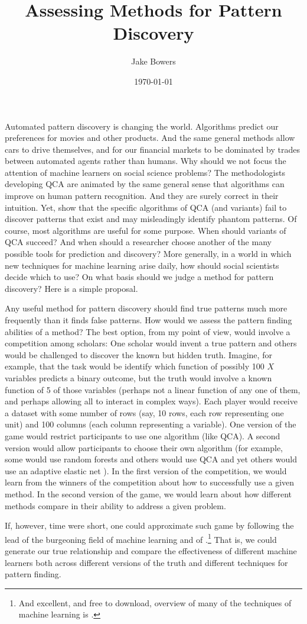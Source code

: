 \documentclass[12pt]{article}
\title{Assessing Methods for Pattern Discovery}
\author{Jake Bowers}
\date{\today}
\begin{document}
\maketitle

Automated pattern discovery is changing the world. Algorithms predict our
preferences for movies and other products. And the same general methods allow
cars to drive themselves, and for our financial markets to be dominated by
trades between automated agents rather than humans. Why should we not focus
the attention of machine learners on social science problems? The
methodologists developing QCA are animated by the same general sense that
algorithms can improve on human pattern recognition. And they are surely
correct in their intuition. Yet, \citet{lucasfk2013} show that the specific
algorithms of QCA (and variants) fail to discover patterns that exist and may
misleadingly identify phantom patterns. Of course, most algorithms are useful
for some purpose. When should variants of QCA succeed? And when should a
researcher choose another of the many possible tools for prediction and
discovery? More generally, in a world in which new techniques for machine
learning arise daily, how should social scientists decide which to use? On
what basis should we judge a method for pattern discovery? Here is a simple
proposal.

Any useful method for pattern discovery should find true patterns much more
frequently than it finds false patterns. How would we assess the pattern
finding abilities of a method? The best option, from my point of view, would
involve a competition among scholars: One scholar would invent a true pattern
and others would be challenged to discover the known but hidden truth.
Imagine, for example, that the task would be identify which function of
possibly 100 $X$ variables predicts a binary outcome, but the truth would
involve a known function of 5 of those variables (perhaps not a linear
function of any one of them, and perhaps allowing all to interact in complex
ways). Each player would receive a dataset with some number of rows (say, 10
rows, each row representing one unit) and 100 columns (each column
representing a variable). One version of the game would restrict participants to use one
algorithm (like QCA). A second version would allow participants to choose
their own algorithm (for example, some would use random forests
\cite{breiman2001random} and others would use QCA and yet others would use an
adaptive elastic net \citet{zou2009adaptive,zou2006adaptive}). In the first
version of the competition, we would learn from the winners of the competition
about how to successfully use a given method. In the second version of the
game, we would learn about how different methods compare in their ability to
address a given problem. 

If, however, time were short, one could approximate such game by following the
lead of the burgeoning field of machine learning and of
\citet{lucasf2013}.\footnote{And excellent, and free to download, overview of
	many of the techniques of machine learning is \citet{hastie2005elements}.}
That is, we could generate our true relationship and compare the effectiveness
of different machine learners both across different versions of the truth  and
different techniques for pattern finding. 
\end{document}
